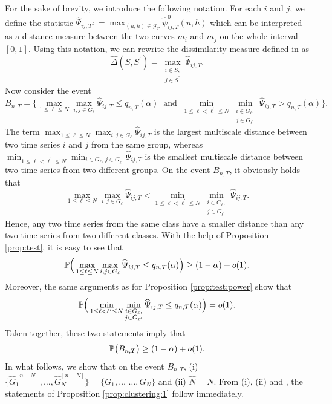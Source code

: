 \documentclass[12pt]{article}
\makeatletter
\renewcommand{\eqref}[1]{\tagform@{\ref{#1}}}
\makeatother
\begin{document}
For the sake of brevity, we introduce the following notation. For each $i$ and $j$, we define the statistic $\widehat{\Psi}_{ij,T} : = \max_{(u, h) \in \mathcal{G}_T}\widehat{\psi}^0_{ij, T}(u, h)$ which can be interpreted as a distance measure between the two curves $m_i$ and $m_j$ on the whole interval $[0, 1]$. Using this notation, we can rewrite the dissimilarity measure defined in \eqref{dissimilarity} as 
\begin{equation*}
\widehat{\Delta}(S,S^\prime) = \max_{\substack{i \in S, \\ j \in S^\prime}} \widehat{\Psi}_{ij,T}. 
\end{equation*}
Now consider the event  
\[ B_{n,T} = \Big\{ \max_{1 \le \ell \le N} \max_{i,j \in G_\ell} \widehat{\Psi}_{ij,T} \le q_{n,T}(\alpha) \ \text{ and } \ \min_{1 \le \ell < \ell^\prime \le N} \min_{\substack{i \in G_\ell, \\ j \in G_{\ell^\prime}}} \widehat{\Psi}_{ij,T} > q_{n,T}(\alpha) \Big\}. \]
The term $\max_{1 \le \ell \le N} \max_{i,j \in G_\ell} \widehat{\Psi}_{ij,T}$ is the largest multiscale distance between two time series $i$ and $j$ from the same group, whereas $\min_{1 \le \ell < \ell^\prime \le N} \min_{i \in G_\ell, \, j \in G_{\ell^\prime}} \widehat{\Psi}_{ij,T}$ is the smallest multiscale distance between two time series from two different groups. On the event $B_{n,T}$, it obviously holds that 
\begin{equation}\label{eq1-prop-clustering-1}
\max_{1 \le \ell \le N} \max_{i,j \in G_\ell} \widehat{\Psi}_{ij,T} < \min_{1 \le \ell < \ell^\prime \le N} \min_{\substack{i \in G_\ell, \\ j \in G_{\ell^\prime}}} \widehat{\Psi}_{ij,T}. 
\end{equation}
Hence, any two time series from the same class have a smaller distance than any two time series from two different classes. With the help of Proposition \ref{prop:test}, it is easy to see that
\[  \mathbb{P} \Big( \max_{1 \le \ell \le N} \max_{i,j \in G_\ell} \widehat{\Psi}_{ij,T} \le q_{n,T}(\alpha) \Big) \ge (1 - \alpha) + o(1). \]
Moreover, the same arguments as for Proposition \ref{prop:test:power} show that 
\[  \mathbb{P} \Big( \min_{1 \le \ell < \ell^\prime \le N} \min_{\substack{i \in G_\ell, \\ j \in G_{\ell^\prime}}} \widehat{\Psi}_{ij,T} \le q_{n,T}(\alpha) \Big) = o(1). \]
Taken together, these two statements imply that 
\begin{equation}\label{eq2-prop-clustering-1}
\mathbb{P} \big( B_{n,T} \big) \ge (1-\alpha) + o(1). 
\end{equation}
In what follows, we show that on the event $B_{n,T}$, (i) $\{ \widehat{G}_1^{[n-N]},\ldots,\widehat{G}_N^{[n-N]} \big\} = \big\{ G_1,\ldots$ $\ldots,G_N \}$ and (ii) $\widehat{N} = N$. From (i), (ii) and \eqref{eq2-prop-clustering-1}, the statements of Proposition \ref{prop:clustering:1} follow immediately. 
\end{document}
